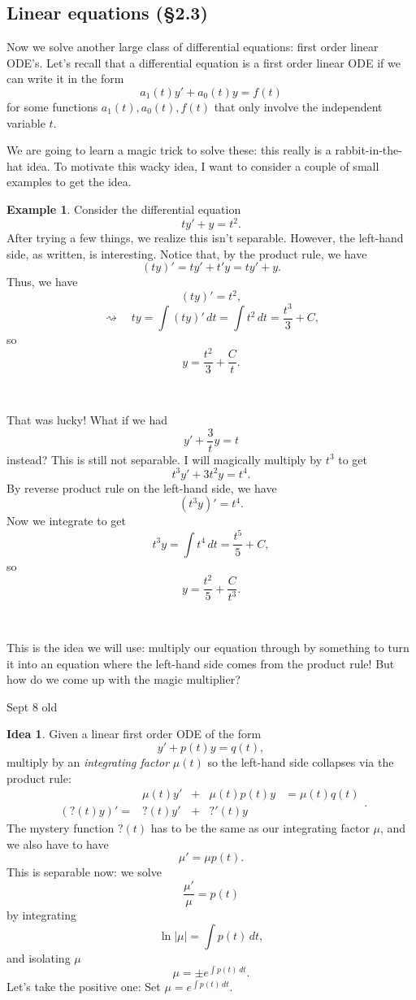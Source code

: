\documentclass[12pt]{amsart}
\numberwithin{equation}{section}
\theoremstyle{plain} %
\newcommand{\Sept}[1]{Sept #1 old}
\newcommand{\rsa}{\rightsquigarrow}
\theoremstyle{definition}
\newtheorem{ex}[equation]{Example}
\newtheorem{idea}[equation]{Idea}
\theoremstyle{remark}
\begin{document}
\subsection*{Linear equations (\S2.3)} Now we solve another large class of differential equations: first order linear ODE's. Let's recall that a differential equation is a first order linear ODE if we can write it in the form
\[ a_1(t) y' + a_0(t) y = f(t)\]
for some functions $a_1(t),a_0(t),f(t)$ that only involve the independent variable $t$.

We are going to learn a magic trick to solve these: this really is a rabbit-in-the-hat idea. To motivate this wacky idea, I want to consider a couple of small examples to get the idea.

\begin{ex}
Consider the differential equation
\[ t y' + y=t^2.\]
After trying a few things, we realize this isn't separable. However, the left-hand side, as written, is interesting. Notice that, by the product rule, we have
\[ (ty)' = t y' + t' y= t y' + y.\]
Thus, we have
\[ (ty)' = t^2,\]
\[\rsa \quad ty = \int (ty)' \, dt = \int t^2 \, dt = \frac{t^3}{3} + C,\]
so \[ y = \frac{t^2}{3} + \frac{C}{t}.\]

\

That was lucky! What if we had
\[ y' + \frac{3}{t} y = t\]
instead? This is still not separable. I will magically multiply by $t^3$ to get
\[ t^3 y' + 3t^2 y = t^4.\]
By reverse product rule on the left-hand side, we have
\[ (t^3 y)' = t^4.\]
Now we integrate to get
\[ t^3 y = \int t^4 \, dt = \frac{t^5}{5} +C,\]
so \[y = \frac{t^2}{5} + \frac{C}{t^3}.\]

\

This is the idea we will use: multiply our equation through by something to turn it into an equation where the left-hand side comes from the product rule! But how do we come up with the magic multiplier?
\end{ex}

\Sept{8}
\begin{idea}
Given a linear first order ODE of the form
\[ y' + p(t) y = q(t),\]
multiply by an \emph{integrating factor} $\mu(t)$ so the left-hand side collapses via the product rule:
\[ \begin{array}{rcccl}
 &\mu(t) y' &+& \mu(t) p(t) y &= \mu(t) q(t)\\
 ( ?(t) y)' = &?(t) y' &+& ?'(t) y & \end{array}.\]
The mystery function $?(t)$ has to be the same as our integrating factor $\mu$, and we also have to have
\[ \mu' = \mu p(t).\]
This is separable now: we solve
\[ \frac{\mu'}{\mu} = p(t)\]
by integrating
\[ \ln |\mu| = \int p(t) \, dt,\]
and isolating $\mu$
\[ \mu = \pm e^{\int p(t) \, dt}.\]
Let's take the positive one:
Set $\mu = e^{\int p(t) \, dt}$.
\end{idea}
\end{document}
